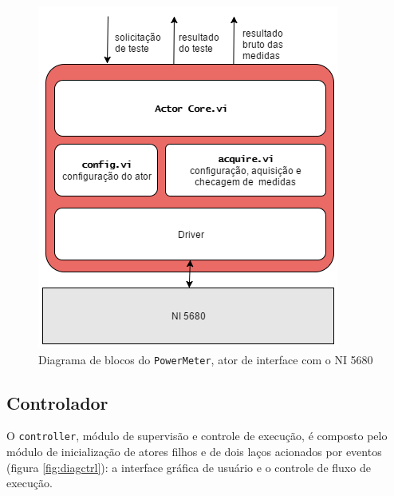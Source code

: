             \begin{figure}
                \centering
                \includegraphics[width=0.7\linewidth]{fig/diag/diagpot.png}
                \caption{Diagrama de blocos do \texttt{PowerMeter}, ator de interface com o NI 5680}
                \label{fig:diagpwmr}
            \end{figure}
            
        \subsection{Controlador}
        
            
            
            
            O \texttt{controller}, módulo de supervisão e controle de execução, é composto pelo módulo de inicialização de atores filhos e de dois laços acionados por eventos (figura \ref{fig:diagctrl}): a interface gráfica de usuário e o controle de fluxo de execução. 
            
